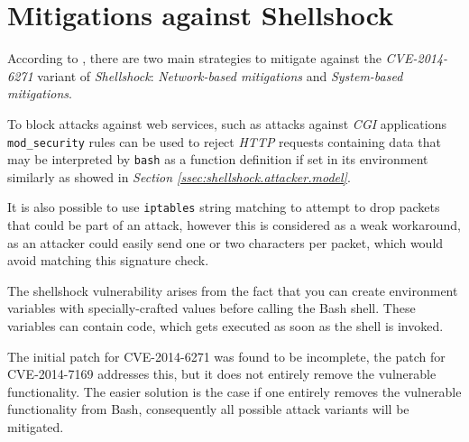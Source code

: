 \documentclass[12pt,a4paper,twocolumn]{article}
\begin{document}


\section{Mitigations against Shellshock }
\label{sec:shellshock.mitigate}




According to \cite{shellshock.CVE-2014-6271.mitigation}, there are two main strategies to mitigate against the \textit{CVE-2014-6271} variant of \textit{Shellshock}\cite{shellshock.CVE-2014-6271}: \textit{Network-based mitigations} and \textit{System-based mitigations}.

To block attacks against web services, such as attacks against \textit{CGI} applications  \lstinline{mod_security} rules\cite{shellshock.CVE-2014-6271.mitigation.modsecurity} can be used to reject \textit{HTTP} requests containing data that may be interpreted by \lstinline{bash} as a function definition if set in its environment similarly as showed in \textit{Section \ref{ssec:shellshock.attacker.model}}. 

It is also possible to use \lstinline{iptables}\cite{bin.iptables} string matching to attempt to drop packets that could be part of an attack, however this is considered  as a weak workaround, as an attacker could easily send one or two characters per packet, which would avoid matching this signature check. \cite{shellshock.CVE-2014-6271.mitigation}

The shellshock vulnerability arises from the fact that you can create environment variables with specially-crafted values before calling the Bash\cite{shell.bash} shell. These variables can contain code, which gets executed as soon as the shell is invoked. 

The initial patch for CVE-2014-6271\cite{shellshock.CVE-2014-6271} was found to be incomplete, the patch for CVE-2014-7169\cite{shellshock.CVE-2014-7169} addresses this, but it does not entirely remove the vulnerable functionality. The easier solution is the case if one entirely removes the vulnerable functionality from Bash, consequently all possible attack variants will be mitigated.\cite{shellshock.CVE-2014-6271.mitigation}
\end{document}
